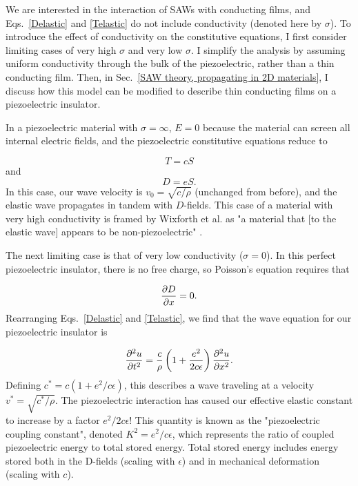 \documentclass{beavtex_dub_edit}
\begin{document}
We are interested in the interaction of SAWs with conducting films, and Eqs.\ \ref{Delastic} and \ref{Telastic} do not include conductivity (denoted here by $\sigma$). To introduce the effect of conductivity on the constitutive equations, I first consider limiting cases of very high $\sigma$ and very low $\sigma$. I simplify the analysis by assuming uniform conductivity through the bulk of the piezoelectric, rather than a thin conducting film. Then, in Sec.\ \ref{SAW theory, propagating in 2D materials}, I discuss how this model can be modified to describe thin conducting films on a piezoelectric insulator.

In a piezoelectric material with $\sigma = \infty$, $E = 0$ because the material can screen all internal electric fields, and the piezoelectric constitutive equations reduce to 

\begin{equation}
    T = cS
\end{equation}
and
\begin{equation}
    D = eS.
\end{equation}
In this case, our wave velocity is $v_0 = \sqrt{c/\rho}$ (unchanged from before), and the elastic wave propagates in tandem with $D$-fields. This case of a material with very high conductivity is framed by Wixforth et al.  as "a material that [to the elastic wave] appears to be non-piezoelectric" \cite{wixforth_surface_1989}.

The next limiting case is that of very low conductivity ($\sigma = 0$). In this perfect piezoelectric insulator, there is no free charge, so Poisson's equation requires that 

\begin{equation}
    \pdv{D}{x} = 0.
\end{equation}
Rearranging Eqs.\ \ref{Delastic} and \ref{Telastic}, we find that the wave equation for our piezoelectric insulator is

\begin{equation}
    \pdv[2]{u}{t} = \frac{c}{\rho} \left(1 + \frac{e^2}{2c\epsilon}\right) \pdv[2]{u}{x}. \label{wave eqn for insulator}
\end{equation}
Defining $c^* = c(1 + e^2/c\epsilon)$, this describes a wave traveling at a velocity $v^* =\sqrt{c^*/\rho}$. The piezoelectric interaction has caused our effective elastic constant to increase by a factor $e^2/2c\epsilon$! This quantity is known as the "piezoelectric coupling constant", denoted $K^2 = e^2/c\epsilon$, which represents the ratio of coupled piezoelectric energy to total stored energy. Total stored energy includes energy stored both in the D-fields (scaling with $\epsilon$) and in mechanical deformation (scaling with $c$). 
\end{document}
